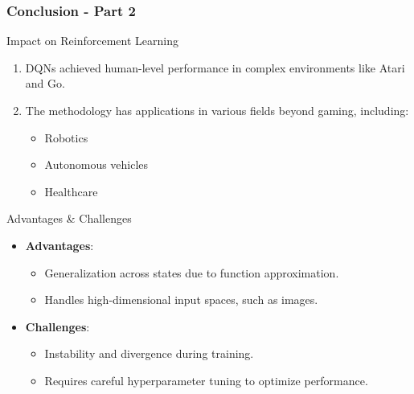 \documentclass[aspectratio=169]{beamer}
\begin{document}
\begin{frame}[fragile]
    \frametitle{Conclusion - Part 2}
    \begin{block}{Impact on Reinforcement Learning}
        \begin{enumerate}
            \item DQNs achieved human-level performance in complex environments like Atari and Go.
            \item The methodology has applications in various fields beyond gaming, including:
                \begin{itemize}
                    \item Robotics
                    \item Autonomous vehicles
                    \item Healthcare
                \end{itemize}
        \end{enumerate}
    \end{block}

    \begin{block}{Advantages \& Challenges}
        \begin{itemize}
            \item \textbf{Advantages}:
                \begin{itemize}
                    \item Generalization across states due to function approximation.
                    \item Handles high-dimensional input spaces, such as images.
                \end{itemize}
            \item \textbf{Challenges}:
                \begin{itemize}
                    \item Instability and divergence during training.
                    \item Requires careful hyperparameter tuning to optimize performance.
                \end{itemize}
        \end{itemize}
    \end{block}
\end{frame}
\end{document}
